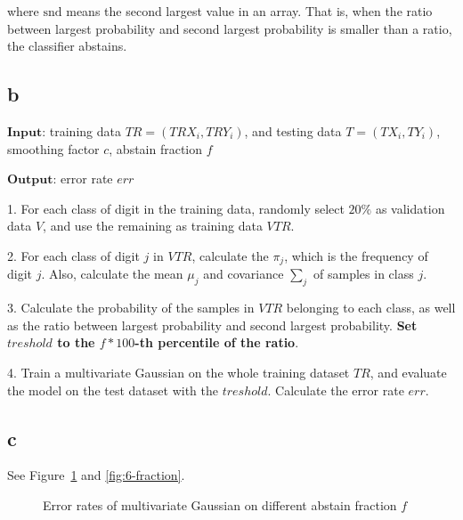 \documentclass[a4paper,11pt]{article}
\theoremstyle{mytheor}
\begin{document}
where $\text{snd}$ means the second largest value in an array. That is, when the ratio between largest probability and second largest probability is smaller than a ratio, the classifier abstains.


\subsection*{b}
$\mathbf{Input}$: training data $TR = (TRX_i, TRY_i)$, and testing data $T = (TX_i, TY_i)$, smoothing factor $c$, abstain fraction $f$

$\mathbf{Output}$: error rate $err$

1. For each class of digit in the training data, randomly select $20\%$ as validation data $V$, and use the remaining as training data $VTR$.

2. For each class of digit $j$ in $VTR$, calculate the $\pi_j$, which is the frequency of digit $j$. Also, calculate the mean $\mu_j$ and covariance $\sum_{j}$ of samples in class $j$.

3. Calculate the probability of the samples in $VTR$ belonging to each class,
as well as the ratio between largest probability and second largest probability.
\textbf{Set $treshold$ to the $f*100$-th percentile of the ratio}. 

4. Train a multivariate Gaussian on the whole training dataset $TR$, and evaluate the model on the test dataset with the $treshold$. Calculate the error rate $err$.

\subsection*{c}
See Figure~\ref{fig:6-error} and \ref{fig:6-fraction}.

\begin{figure}[h]
	\caption{Error rates of multivariate Gaussian on different abstain fraction $f$}
	\label{fig:6-error}
\end{figure}
\end{document}
